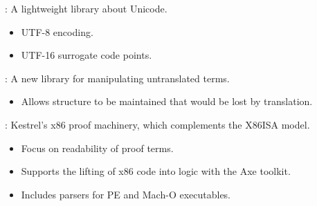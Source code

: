 
\begin{frame}

\newlibtitle

:
A lightweight library about Unicode.
\begin{itemize}
\item UTF-8 encoding.
\item UTF-16 surrogate code points.
\end{itemize}

\end{frame}


\begin{frame}

\newlibtitle

:
A new library for manipulating untranslated terms.
\begin{itemize}
\item Allows structure to be maintained that would be lost by translation.
\end{itemize}

\end{frame}


\begin{frame}

\newlibtitle

:
Kestrel's x86 proof machinery, which complements the X86ISA model.
\begin{itemize}
\item Focus on readability of proof terms.
\item Supports the lifting of x86 code into logic with the Axe toolkit.
\item Includes parsers for PE and Mach-O executables.
\end{itemize}

\end{frame}


